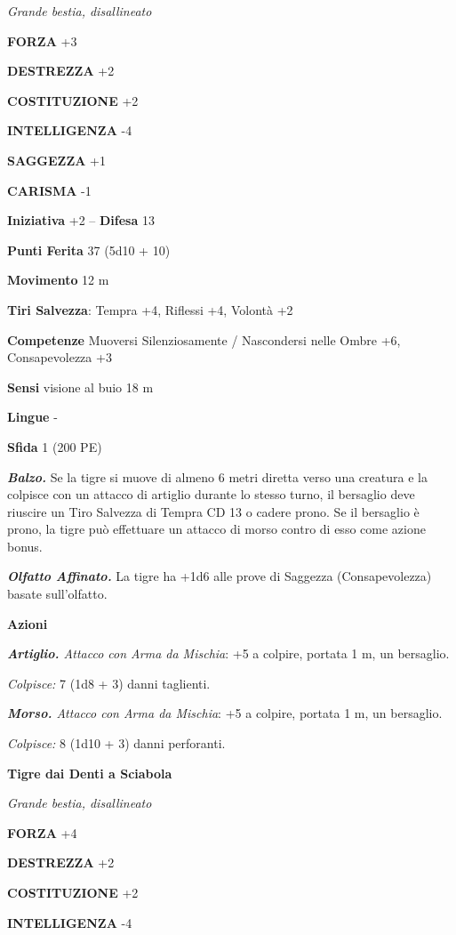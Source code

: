 \begin{multicols}{2}
\emph{Grande bestia, disallineato}

\textbf{FORZA} +3

\textbf{DESTREZZA} +2

\textbf{COSTITUZIONE} +2

\textbf{INTELLIGENZA} -4

\textbf{SAGGEZZA} +1

\textbf{CARISMA} -1

\textbf{Iniziativa} +2 -- \textbf{Difesa} 13

\textbf{Punti Ferita} 37 (5d10 + 10)

\textbf{Movimento} 12 m

\textbf{Tiri Salvezza}: Tempra +4, Riflessi +4, Volontà +2

\textbf{Competenze} Muoversi Silenziosamente / Nascondersi nelle Ombre +6, Consapevolezza +3

\textbf{Sensi} visione al buio 18 m

\textbf{Lingue} -

\textbf{Sfida} 1 (200 PE)

\emph{\textbf{Balzo.}} Se la tigre si muove di almeno 6 metri diretta verso una creatura e la colpisce con un attacco di artiglio durante lo stesso turno, il bersaglio deve riuscire un Tiro Salvezza di Tempra CD 13 o cadere prono. Se il bersaglio è prono, la tigre può effettuare un attacco di morso contro di esso come azione bonus.

\emph{\textbf{Olfatto Affinato.}} La tigre ha +1d6 alle prove di Saggezza (Consapevolezza) basate sull'olfatto.

\textbf{Azioni}

\emph{\textbf{Artiglio.} Attacco con Arma da Mischia}: +5 a colpire, portata 1 m, un bersaglio.

\emph{Colpisce:} 7 (1d8 + 3) danni taglienti.

\emph{\textbf{Morso.} Attacco con Arma da Mischia}: +5 a colpire, portata 1 m, un bersaglio.

\emph{Colpisce:} 8 (1d10 + 3) danni perforanti.

\medskip\textbf{Tigre dai Denti a Sciabola}

\emph{Grande bestia, disallineato}

\textbf{FORZA} +4

\textbf{DESTREZZA} +2

\textbf{COSTITUZIONE} +2

\textbf{INTELLIGENZA} -4


\end{multicols}
